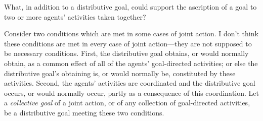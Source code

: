 \documentclass[12pt,a4paper]{extarticle}
\begin{document}
\begin{comment}
To illustrate, suppose some hoodlums each individually set about destroying a bus.  They are not members of a group; the coincident timing and target of their actions is due only to the bus' salience and the time of day.  Each hoodlum's goal is the bus' destruction.  They are unconcerned about, and largely unaware of, each other's involvement.  Their activities are uncoordinated, each rendering others' activities less effective and increasing risk of injury.  The bus' destruction is a distributive goal of their activities.  
Is there a sense in which their activities taken together have a goal which isn't just a matter of each agent's activities individually having that goal?
Perhaps there is because, as it happens, their distributive goal is achieved as a common effect of all of their activities.
But this is either not a joint action or else a very minimal form of joint action.  The examples of joint action without shared intention which I gave above are joint actions in a slightly richer sense.
\end{comment}

\reversemarginpar
{} 
\normalmarginpar

What, in addition to a distributive goal, could support the ascription of a goal to two or more agents' activities taken together?

Consider two conditions which are met in some cases of joint action.  
I don't think these conditions are met in every case of joint action---they are not supposed to be necessary conditions.
First, the distributive goal obtains, or would normally obtain, as a common effect of all of the agents' goal-directed activities; or else the distributive goal's obtaining is, or would normally be, constituted by these activities.  
Second, the agents' activities are coordinated and the distributive goal occurs, or would normally occur, partly as a consequence of this coordination.  Let a \emph{collective goal} of a joint action, or of any collection of goal-directed activities, be a distributive goal meeting these two conditions.
\end{document}
